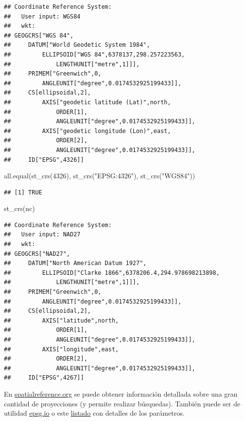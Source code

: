 \documentclass[
  spanish,
]{book}
\newenvironment{Shaded}{\begin{snugshade}}{\end{snugshade}}
\newcommand{\DecValTok}[1]{\textcolor[rgb]{0.00,0.00,0.81}{#1}}
\newcommand{\FunctionTok}[1]{\textcolor[rgb]{0.00,0.00,0.00}{#1}}
\newcommand{\NormalTok}[1]{#1}
\newcommand{\StringTok}[1]{\textcolor[rgb]{0.31,0.60,0.02}{#1}}
\theoremstyle{break}
\begin{document}
\begin{verbatim}
## Coordinate Reference System:
##   User input: WGS84 
##   wkt:
## GEOGCRS["WGS 84",
##     DATUM["World Geodetic System 1984",
##         ELLIPSOID["WGS 84",6378137,298.257223563,
##             LENGTHUNIT["metre",1]]],
##     PRIMEM["Greenwich",0,
##         ANGLEUNIT["degree",0.0174532925199433]],
##     CS[ellipsoidal,2],
##         AXIS["geodetic latitude (Lat)",north,
##             ORDER[1],
##             ANGLEUNIT["degree",0.0174532925199433]],
##         AXIS["geodetic longitude (Lon)",east,
##             ORDER[2],
##             ANGLEUNIT["degree",0.0174532925199433]],
##     ID["EPSG",4326]]
\end{verbatim}

\begin{Shaded}
\begin{Highlighting}[]
\FunctionTok{all.equal}\NormalTok{(}\FunctionTok{st\_crs}\NormalTok{(}\DecValTok{4326}\NormalTok{), }\FunctionTok{st\_crs}\NormalTok{(}\StringTok{"EPSG:4326"}\NormalTok{), }\FunctionTok{st\_crs}\NormalTok{(}\StringTok{"WGS84"}\NormalTok{))}
\end{Highlighting}
\end{Shaded}

\begin{verbatim}
## [1] TRUE
\end{verbatim}

\begin{Shaded}
\begin{Highlighting}[]
\FunctionTok{st\_crs}\NormalTok{(nc)}
\end{Highlighting}
\end{Shaded}

\begin{verbatim}
## Coordinate Reference System:
##   User input: NAD27 
##   wkt:
## GEOGCRS["NAD27",
##     DATUM["North American Datum 1927",
##         ELLIPSOID["Clarke 1866",6378206.4,294.978698213898,
##             LENGTHUNIT["metre",1]]],
##     PRIMEM["Greenwich",0,
##         ANGLEUNIT["degree",0.0174532925199433]],
##     CS[ellipsoidal,2],
##         AXIS["latitude",north,
##             ORDER[1],
##             ANGLEUNIT["degree",0.0174532925199433]],
##         AXIS["longitude",east,
##             ORDER[2],
##             ANGLEUNIT["degree",0.0174532925199433]],
##     ID["EPSG",4267]]
\end{verbatim}

En \href{https://spatialreference.org}{spatialreference.org} se puede obtener información detallada sobre una gran cantidad de proyecciones (y permite realizar búsquedas).
También puede ser de utilidad \href{https://epsg.io}{epsg.io} o este \href{https://proj.org/operations/projections}{listado} con detalles de los parámetros.
\end{document}
